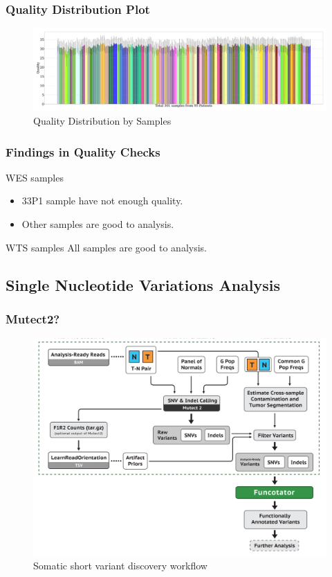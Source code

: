 \documentclass{beamer}
\begin{document}
    \begin{frame}
        \frametitle{Quality Distribution Plot}

        \begin{figure}
            \includegraphics[width=\linewidth]{figures/CollectMultipleMetrics/BWA.pdf}
            \caption{Quality Distribution by Samples}
        \end{figure}
    \end{frame}

    \begin{frame}
        \frametitle{Findings in Quality Checks}

        \begin{alertblock}{WES samples}
            \begin{itemize}
                \item 33P1 sample have not enough quality.
                \item Other samples are good to analysis.
            \end{itemize}
        \end{alertblock}

        \begin{exampleblock}{WTS samples}
            All samples are good to analysis.
        \end{exampleblock}
    \end{frame}

    \subsection{Single Nucleotide Variations Analysis}
    \begin{frame}
        \frametitle{Mutect2?}

        \begin{figure}
            \includegraphics[width=0.6 \linewidth]{figures/Workflow/somatic_short_variants.png}
            \caption{Somatic short variant discovery workflow \protect\cite{gatk1, gatk2}}
        \end{figure}
    \end{frame}
\end{document}
